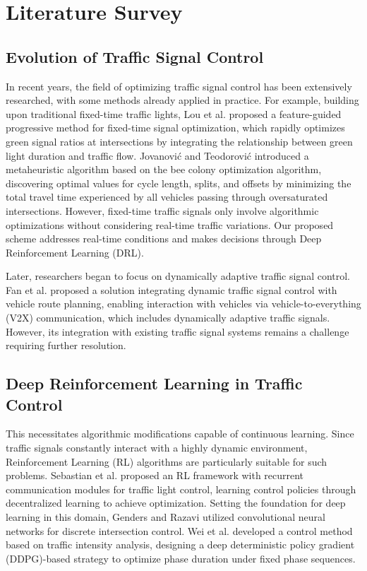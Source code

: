\chapter{Literature Survey}
\label{chap:lit_survey}

\section{Evolution of Traffic Signal Control}
In recent years, the field of optimizing traffic signal control has been extensively researched, with some methods already applied in practice. For example, building upon traditional fixed-time traffic lights, Lou et al. \cite{lou_fixed} proposed a feature-guided progressive method for fixed-time signal optimization, which rapidly optimizes green signal ratios at intersections by integrating the relationship between green light duration and traffic flow. Jovanovi\'c and Teodorovi\'c \cite{jovanovic_bee} introduced a metaheuristic algorithm based on the bee colony optimization algorithm, discovering optimal values for cycle length, splits, and offsets by minimizing the total travel time experienced by all vehicles passing through oversaturated intersections. However, fixed-time traffic signals only involve algorithmic optimizations without considering real-time traffic variations. Our proposed scheme addresses real-time conditions and makes decisions through Deep Reinforcement Learning (DRL).

Later, researchers began to focus on dynamically adaptive traffic signal control. Fan et al. \cite{fan_routing} proposed a solution integrating dynamic traffic signal control with vehicle route planning, enabling interaction with vehicles via vehicle-to-everything (V2X) communication, which includes dynamically adaptive traffic signals. However, its integration with existing traffic signal systems remains a challenge requiring further resolution.

\section{Deep Reinforcement Learning in Traffic Control}
This necessitates algorithmic modifications capable of continuous learning. Since traffic signals constantly interact with a highly dynamic environment, Reinforcement Learning (RL) algorithms are particularly suitable for such problems. Sebastian et al. \cite{sebastian_rl} proposed an RL framework with recurrent communication modules for traffic light control, learning control policies through decentralized learning to achieve optimization. Setting the foundation for deep learning in this domain, Genders and Razavi \cite{genders2016using} utilized convolutional neural networks for discrete intersection control. Wei et al. \cite{wei_ddpg} developed a control method based on traffic intensity analysis, designing a deep deterministic policy gradient (DDPG)-based strategy to optimize phase duration under fixed phase sequences.

